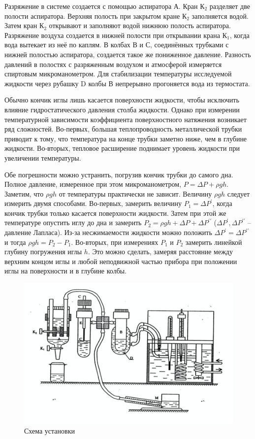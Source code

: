 \documentclass[a4paper,12pt]{article}
\begin{document}
Разряжение в системе создается с помощью аспиратора А. Кран $К_2$ разделяет две полости аспиратора. Верхняя полость при закрытом кране $К_2$  заполняется водой. Затем кран $К_2$ открывают и заполняют водой  нижнюю полость  аспиратора.  Разряжение воздуха создается в нижней полости  при открывании крана $К_1$, когда  вода вытекает из неё по каплям. В колбах В и С, соединённых трубками с нижней полостью аспиратора,  создается такое же пониженное давление. Разность давлений в полостях с разряженным воздухом и атмосферой измеряется спиртовым микроманометром.
Для стабилизации температуры исследуемой жидкости через рубашку D колбы В непрерывно прогоняется вода из термостата.


Обычно кончик иглы лишь касается поверхности жидкости, чтобы исключить влияние гидростатического давления столба жидкости. Однако при измерении температурной зависимости коэффициента поверхностного натяжения возникает ряд сложностей. Во-первых, большая теплопроводность металлической трубки приводит к тому, что температура на конце трубки заметно ниже, чем в глубине жидкости. Во-вторых, тепловое расширение поднимает уровень жидкости при увеличении температуры. 


Обе погрешности можно устранить, погрузив кончик трубки до самого дна. Полное давление, измеренное при этом микроманометром, $P = \Delta P + \rho g h$. Заметим, что $\rho g h$  от температуры практически не зависит. Величину  $\rho g h$ следует измерить двумя способами. Во-первых, замерить величину  $P_1 = \Delta P ^\prime$, когда кончик трубки только касается поверхности жидкости. Затем при этой же температуре опустить иглу до дна и замерить $P_2 = \rho g h  + \Delta P+ \Delta P ^{\prime\prime}$ ($\Delta P^\prime, \Delta P^{\prime\prime}$ -- давление Лапласа). Из-за  несжимаемости  жидкости можно положить $\Delta P^\prime= \Delta P^{\prime\prime} $ и тогда $\rho gh = P_2-P_1$. Во-вторых, при измерениях $P_1$ и $P_2$ замерить линейкой  глубину погружения иглы $h$. Это можно сделать, замеряя расстояние между верхним концом иглы и любой неподвижной частью прибора при положении иглы на поверхности и в глубине колбы.


\begin{figure} [h!]
	\centering 
	\includegraphics[scale=0.312]{1.jpg} 
	\caption{Схема установки} 
\end{figure}
\end{document}
